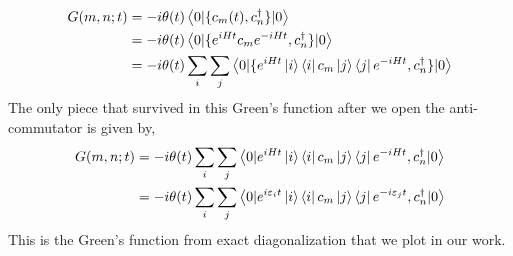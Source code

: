 \documentclass{article}
\begin{document}
\begin{equation}
\begin{aligned}
    G(m,n;t) &= -i \theta(t)\left\langle 0|\{c_m(t) ,{c_n^{\dagger}}\}|0\right\rangle\\
    &= -i \theta(t)\left\langle 0|\{e^{iHt}c_m e^{-iHt} ,{c_n^{\dagger}}\}|0\right\rangle\\
    &= -i \theta(t)\sum_i\sum_j\left\langle 0|\{e^{iHt}\ket{i}\bra{i}c_m \ket{j}\bra{j}e^{-iHt} ,{c_n^{\dagger}}\}|0\right\rangle\\ 
\end{aligned}
\label{Greens definition}
\end{equation}
The only piece that survived in this Green's function after we open the anti-commutator is given by,
\begin{equation}
\begin{aligned}
    G(m,n;t)
    &= -i \theta(t)\sum_i\sum_j\left\langle 0|e^{iHt}\ket{i}\bra{i}c_m \ket{j}\bra{j}e^{-iHt} ,{c_n^{\dagger}}|0\right\rangle\\ 
    &= -i \theta(t)\sum_i\sum_j\left\langle 0|e^{i\varepsilon_it}\ket{i}\bra{i}c_m \ket{j}\bra{j}e^{-i\varepsilon_j t} ,{c_n^{\dagger}}|0\right\rangle\\ 
\end{aligned}
\label{Greens definition RT}
\end{equation}
This is the Green's function from exact diagonalization that we plot in our work.


\end{document}
